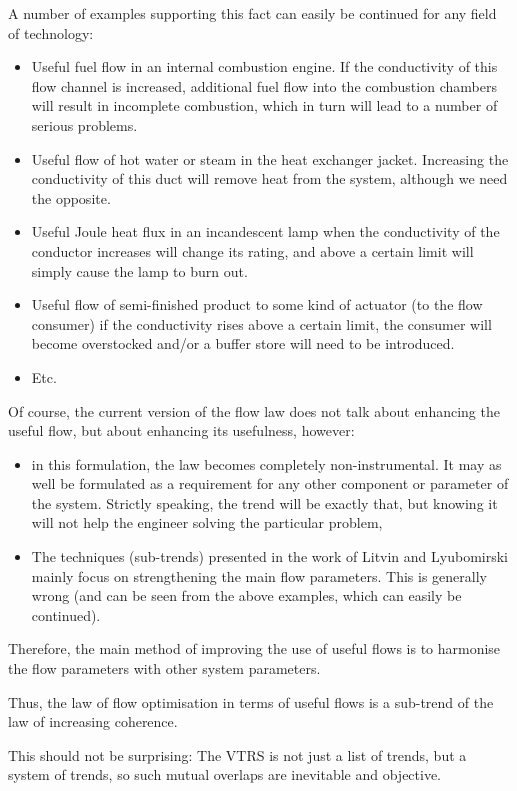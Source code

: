 \documentclass[a4paper,11pt]{article}
\begin{document}
A number of examples supporting this fact can easily be continued for any
field of technology:
\begin{itemize}
\item Useful fuel flow in an internal combustion engine. If the conductivity
  of this flow channel is increased, additional fuel flow into the combustion
  chambers will result in incomplete combustion, which in turn will lead to a
  number of serious problems.
\item Useful flow of hot water or steam in the heat exchanger jacket.
  Increasing the conductivity of this duct will remove heat from the system,
  although we need the opposite.
\item Useful Joule heat flux in an incandescent lamp when the conductivity of
  the conductor increases will change its rating, and above a certain limit
  will simply cause the lamp to burn out.
\item Useful flow of semi-finished product to some kind of actuator (to the
  flow consumer) if the conductivity rises above a certain limit, the consumer
  will become overstocked and/or a buffer store will need to be introduced.
\item Etc.
\end{itemize}
Of course, the current version of the flow law does not talk about enhancing
the useful flow, but about enhancing its usefulness, however:
\begin{itemize}
\item in this formulation, the law becomes completely non-instrumental. It may
  as well be formulated as a requirement for any other component or parameter
  of the system. Strictly speaking, the trend will be exactly that, but
  knowing it will not help the engineer solving the particular problem,
\item The techniques (sub-trends) presented in the work of Litvin and
  Lyubomirski mainly focus on strengthening the main flow parameters. This is
  generally wrong (and can be seen from the above examples, which can easily
  be continued).
\end{itemize}
Therefore, the main method of improving the use of useful flows is to
harmonise the flow parameters with other system parameters.

Thus, the law of flow optimisation in terms of useful flows is a sub-trend of
the law of increasing coherence.

This should not be surprising: The VTRS is not just a list of trends, but a
system of trends, so such mutual overlaps are inevitable and objective.
\end{document}
